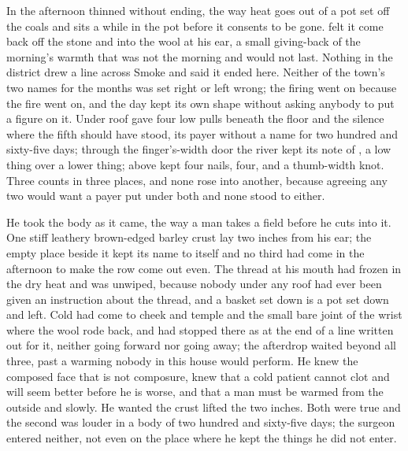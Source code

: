 In  the afternoon thinned without ending, the way heat goes out of a pot set off the coals and sits a while in the pot before it consents to be gone.  felt it come back off the stone and into the wool at his ear, a small giving-back of the morning's warmth that was not the morning and would not last. Nothing in the district drew a line across Smoke and said it ended here. Neither of the town's two names for the months was set right or left wrong; the firing went on because the fire went on, and the day kept its own shape without asking anybody to put a figure on it. Under  roof  gave four low pulls beneath the floor and the silence where the fifth should have stood, its payer without a name for two hundred and sixty-five days; through the finger's-width door the river kept its note of , a low thing over a lower thing; above   kept four nails, four, and a thumb-width knot. Three counts in three places, and none rose into another, because agreeing any two would want a payer put under both and none stood to either.

He took the body as it came, the way a man takes a field before he cuts into it. One stiff leathery brown-edged barley crust lay two inches from his ear; the empty place beside it kept its name to itself and no third had come in the afternoon to make the row come out even. The thread at his mouth had frozen in the dry heat and was unwiped, because nobody under any roof had ever been given an instruction about the thread, and a basket set down is a pot set down and left. Cold had come to cheek and temple and the small bare joint of the wrist where the wool rode back, and had stopped there as at the end of a line written out for it, neither going forward nor going away; the afterdrop waited beyond all three, past a warming nobody in this house would perform. He knew the composed face that is not composure, knew that a cold patient cannot clot and will seem better before he is worse, and that a man must be warmed from the outside and slowly. He wanted the crust lifted the two inches. Both were true and the second was louder in a body of two hundred and sixty-five days; the surgeon entered neither, not even on the place where he kept the things he did not enter.

\scenebreak

